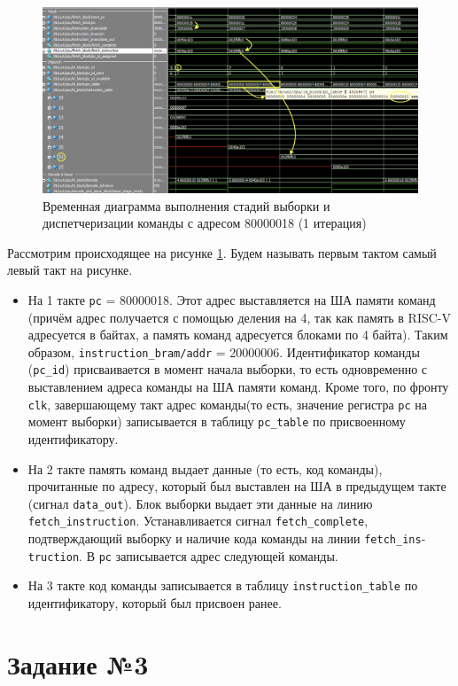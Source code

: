\documentclass[12pt]{report}
\begin{document}
\begin{figure}[h!p]
	\centering
	\includegraphics[width = \linewidth]{fetchDispatch80000018.png}
	\caption{Временная диаграмма выполнения стадий выборки и диспетчеризации команды с адресом 80000018 (1 итерация)}
	\label{fetchDispatch80000018}
\end{figure}
Рассмотрим происходящее на рисунке \ref{fetchDispatch80000018}. Будем называть первым тактом самый левый такт на рисунке.
\begin{itemize}
    \item На 1 такте \verb|pc| = 80000018. Этот адрес выставляется на ША памяти команд (причём адрес получается с помощью деления на 4, так как память в RISC-V адресуется в байтах, а память команд адресуется блоками по 4 байта). Таким образом, \verb|instruction_bram/addr| = 20000006. Идентификатор команды (\verb|pc_id|) присваивается в момент начала выборки, то есть одновременно с выставлением адреса команды на ША памяти команд. Кроме того, по фронту \verb|clk|, завершающему такт адрес команды(то есть, значение регистра \verb|pc| на момент выборки) записывается в таблицу \verb|pc_table| по присвоенному идентификатору.  
    \item На 2 такте память команд выдает данные (то есть, код команды), прочитанные по адресу, который был выставлен на ША в предыдущем такте (сигнал \verb|data_out|). Блок выборки выдает эти данные на линию \verb|fetch_instruction|. Устанавливается сигнал \verb|fetch_complete|, подтверждающий выборку и наличие кода команды на линии \verb|fetch_ins|-\verb|truction|. В \verb|pc| записывается адрес следующей команды.
    \item На 3 такте код команды записывается в таблицу \verb|instruction_table| по идентификатору, который был присвоен ранее.
\end{itemize}

\chapter{Задание №3}
\end{document}

